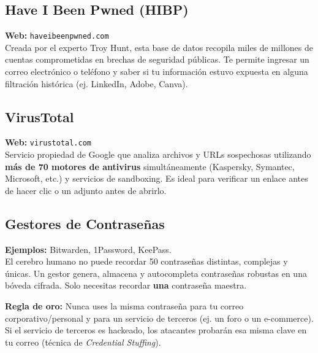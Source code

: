 \documentclass[12pt,a4paper]{article}
\begin{document}
\subsection{Have I Been Pwned (HIBP)}
\begin{cajaHerramienta}
\textbf{Web:} \texttt{haveibeenpwned.com}\\[4pt]
Creada por el experto Troy Hunt, esta base de datos recopila miles de millones de cuentas comprometidas en brechas de seguridad p\'ublicas. Te permite ingresar un correo electr\'onico o tel\'efono y saber si tu informaci\'on estuvo expuesta en alguna filtraci\'on hist\'orica (ej. LinkedIn, Adobe, Canva).
\end{cajaHerramienta}

\subsection{VirusTotal}
\begin{cajaHerramienta}
\textbf{Web:} \texttt{virustotal.com}\\[4pt]
Servicio propiedad de Google que analiza archivos y URLs sospechosas utilizando \textbf{m\'as de 70 motores de antivirus} simult\'aneamente (Kaspersky, Symantec, Microsoft, etc.) y servicios de sandboxing. Es ideal para verificar un enlace antes de hacer clic o un adjunto antes de abrirlo.
\end{cajaHerramienta}

\subsection{Gestores de Contrase\~nas}
\begin{cajaHerramienta}
\textbf{Ejemplos:} Bitwarden, 1Password, KeePass.\\[4pt]
El cerebro humano no puede recordar 50 contrase\~nas distintas, complejas y \'unicas. Un gestor genera, almacena y autocompleta contrase\~nas robustas en una b\'oveda cifrada. Solo necesitas recordar \textbf{una} contrase\~na maestra.
\end{cajaHerramienta}

\begin{cajaNota}
\textbf{Regla de oro:} Nunca uses la misma contrase\~na para tu correo corporativo/personal y para un servicio de terceros (ej. un foro o un e-commerce). Si el servicio de terceros es hackeado, los atacantes probar\'an esa misma clave en tu correo (t\'ecnica de \emph{Credential Stuffing}).
\end{cajaNota}
\end{document}
